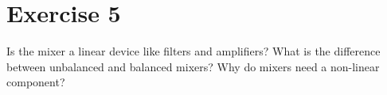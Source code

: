 %
%
%

{}
\section*{Exercise 5}

\begin{question}[subtitle={Mixers}]
	\begin{tasks}
		\task
		Is the mixer a linear device like filters and amplifiers?
		\task
		What is the difference between unbalanced and balanced mixers?
		\task
		Why do mixers need a non-linear component?
	\end{tasks}
\end{question}

